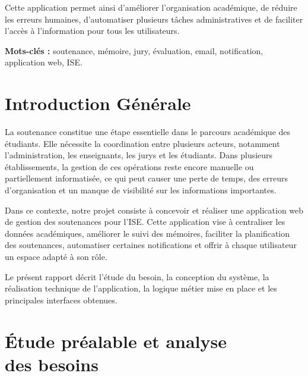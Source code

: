 \documentclass[a4paper,12pt,oneside]{report}
\begin{document}
Cette application permet ainsi d'améliorer l'organisation académique, de réduire les erreurs humaines, d'automatiser plusieurs tâches administratives et de faciliter l'accès à l'information pour tous les utilisateurs.

\vspace{0.5cm}
\noindent\textbf{Mots-clés :} soutenance, mémoire, jury, évaluation, email, notification, application web, ISE.

\clearpage

\pagestyle{plain}
{\hypersetup{linkcolor=black}
\tableofcontents
\clearpage
\listoffigures
\clearpage
\clearpage
}
\pagestyle{fancy}
\hypersetup{linkcolor=mainorange}

\chapter*{Introduction Générale}

La soutenance constitue une étape essentielle dans le parcours académique des étudiants. Elle nécessite la coordination entre plusieurs acteurs, notamment l'administration, les enseignants, les jurys et les étudiants. Dans plusieurs établissements, la gestion de ces opérations reste encore manuelle ou partiellement informatisée, ce qui peut causer une perte de temps, des erreurs d'organisation et un manque de visibilité sur les informations importantes.

Dans ce contexte, notre projet consiste à concevoir et réaliser une application web de gestion des soutenances pour l'ISE. Cette application vise à centraliser les données académiques, améliorer le suivi des mémoires, faciliter la planification des soutenances, automatiser certaines notifications et offrir à chaque utilisateur un espace adapté à son rôle.

Le présent rapport décrit l'étude du besoin, la conception du système, la réalisation technique de l'application, la logique métier mise en place et les principales interfaces obtenues.

\chapter[Étude préalable et analyse des besoins]{Étude préalable et analyse\\ des besoins}
\end{document}
